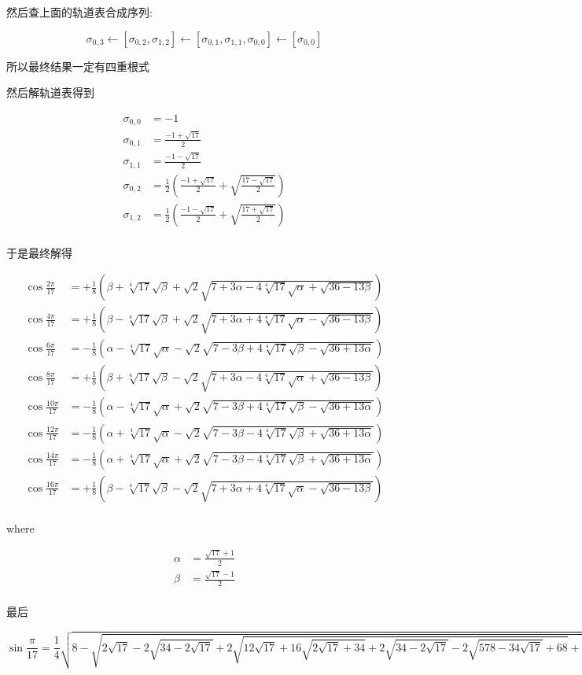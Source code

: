 然后查上面的轨道表合成序列:

$$
σ_{0,3} 
←[σ_{0,2}, σ_{1,2}]
←[σ_{0,1}, σ_{1,1}, σ_{0,0}]
←[σ_{0,0}]
$$

所以最终结果一定有四重根式

然后解轨道表得到

$$
\begin{aligned}
σ_{0,0}&= -1\\
σ_{0,1}&= \frac{-1+\sqrt{17}}{2}\\
σ_{1,1}&= \frac{-1-\sqrt{17}}{2}\\
σ_{0,2}&= \frac{1}{2} \left(\frac{-1+\sqrt{17}}{2}+\sqrt{\frac{17-\sqrt{17}}{2}}\right)\\
σ_{1,2}&=\frac{1}{2} \left(\frac{-1-\sqrt{17}}{2}+\sqrt{\frac{17+\sqrt{17}}{2}}\right)\\
\end{aligned}
$$

于是最终解得

$$
\begin{aligned}
\cos\frac{2π}{17}&=+\frac{1}{8} \left(β+\sqrt[4]{17} \sqrt{β}+\sqrt{2} \sqrt{7+3 α -4 \sqrt[4]{17} \sqrt{α }+\sqrt{36-13 β}}\right) \\
\cos\frac{4π}{17}&=+\frac{1}{8} \left(β-\sqrt[4]{17} \sqrt{β}+\sqrt{2} \sqrt{7+3 α +4 \sqrt[4]{17} \sqrt{α }-\sqrt{36-13 β}}\right) \\
\cos\frac{6π}{17}&=-\frac{1}{8} \left(α -\sqrt[4]{17} \sqrt{α }-\sqrt{2} \sqrt{7-3 β+4 \sqrt[4]{17} \sqrt{β}-\sqrt{36+13 α }}\right) \\
\cos\frac{8π}{17}&=+\frac{1}{8} \left(β+\sqrt[4]{17} \sqrt{β}-\sqrt{2} \sqrt{7+3 α -4 \sqrt[4]{17} \sqrt{α }+\sqrt{36-13 β}}\right) \\
\cos\frac{10π}{17}&=-\frac{1}{8} \left(α -\sqrt[4]{17} \sqrt{α }+\sqrt{2} \sqrt{7-3 β+4 \sqrt[4]{17} \sqrt{β}-\sqrt{36+13 α }}\right) \\
\cos\frac{12π}{17}&=-\frac{1}{8} \left(α +\sqrt[4]{17} \sqrt{α }-\sqrt{2} \sqrt{7-3 β-4 \sqrt[4]{17} \sqrt{β}+\sqrt{36+13 α }}\right) \\
\cos\frac{14π}{17}&=-\frac{1}{8} \left(α +\sqrt[4]{17} \sqrt{α }+\sqrt{2} \sqrt{7-3 β-4 \sqrt[4]{17} \sqrt{β}+\sqrt{36+13 α }}\right) \\
\cos\frac{16π}{17}&=+\frac{1}{8} \left(β-\sqrt[4]{17} \sqrt{β}-\sqrt{2} \sqrt{7+3 α +4 \sqrt[4]{17} \sqrt{α }-\sqrt{36-13 β}}\right) \\
\end{aligned}
$$

where

$$
\begin{aligned}
α &= \frac{\sqrt{17}+1}{2}\\
β &= \frac{\sqrt{17}-1}{2}\\
\end{aligned}
$$

最后 

$$
\sin\frac{π}{17}=\frac{1}{4} \sqrt{8-\sqrt{2 \sqrt{17}-2 \sqrt{34-2 \sqrt{17}}+2 \sqrt{12 \sqrt{17}+16 \sqrt{2 \sqrt{17}+34}+2 \sqrt{34-2 \sqrt{17}}-2 \sqrt{578-34 \sqrt{17}}+68}+30}}
$$